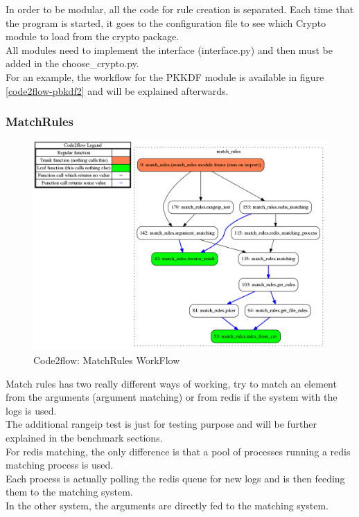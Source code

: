\documentclass{eplmastersthesis}
\begin{document}
In order to be modular, all the code for rule creation is separated. Each time that the program is started, it goes to the configuration file to see which Crypto module to load from the crypto package.\\
All modules need to implement the interface (interface.py) and then must be added in the choose\_crypto.py.\\
For an example, the workflow for the PKKDF module is available in figure \ref{code2flow-pbkdf2} and will be explained afterwards.

\subsubsection{MatchRules}
\begin{figure}[h!]
\begin{center}
	\includegraphics[scale=0.3]{res/flowMatchRules}
	\caption{Code2flow: MatchRules WorkFlow}
	\label{code2flow-matchRules}
\end{center}
\end{figure}

Match rules has two really different ways of working, try to match an element from the arguments (argument matching) or from redis if the system with the logs is used.\\
The additional rangeip test is just for testing purpose and will be further explained in the benchmark sections.\\

For redis matching, the only difference is that a pool of processes running a redis matching process is used.\\
Each process is actually polling the redis queue for new logs and is then feeding them to the matching system.\\
In the other system, the arguments are directly fed to the matching system.\\
\end{document}
